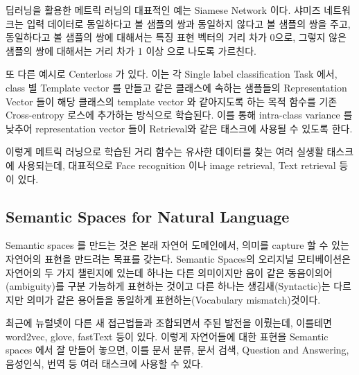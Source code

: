 딥러닝을 활용한 메트릭 러닝의 대표적인 예는 Siamese Network 이다. 샤미즈 네트워크는 입력 데이터로 동일하다고 볼 샘플의 쌍과 동일하지 않다고 볼 샘플의 쌍을 주고, 동일하다고 볼 샘플의 쌍에 대해서는 특징 표현 벡터의 거리 차가 0으로, 그렇지 않은 샘플의 쌍에 대해서는 거리 차가 1 이상 으로 나도록 가르친다. 

또 다른 예시로 Centerloss 가 있다. 이는 각 Single label classification Task 에서, class 별 Template vector 를 만들고 같은 클래스에 속하는 샘플들의 Representation Vector 들이 해당 클래스의 template vector 와 같아지도록 하는 목적 함수를 기존 Cross-entropy 로스에 추가하는 방식으로 학습된다. 이를 통해 intra-class variance 를 낮추어 representation vector 들이 Retrieval와 같은 태스크에 사용될 수 있도록 한다. 

이렇게 메트릭 러닝으로 학습된 거리 함수는 유사한 데이터를 찾는 여러 실생활 태스크에 사용되는데, 대표적으로 Face recognition 이나 image retrieval, Text retrieval 등이 있다. 


\subsection{Semantic Spaces for Natural Language}

Semantic spaces 를 만드는 것은 본래 자연어 도메인에서, 의미를 capture 할 수 있는 자연어의 표현을 만드려는 목표를 갖는다. Semantic Spaces의 오리지널 모티베이션은 자연어의 두 가지 챌린지에 있는데 하나는 다른 의미이지만 음이 같은 동음이의어(ambiguity)를 구분 가능하게 표현하는 것이고 다른 하나는 생김새(Syntactic)는 다르지만 의미가 같은 용어들을 동일하게 표현하는(Vocabulary mismatch)것이다. 

최근에 뉴럴넷이 다른 새 접근법들과 조합되면서 주된 발전을 이뤘는데, 이를테면 word2vec, glove, fastText 등이 있다. 이렇게 자연어들에 대한 표현을 Semantic spaces 에서 잘 만들어 놓으면, 이를 문서 분류, 문서 검색, Question and Answering, 음성인식, 번역 등 여러 태스크에 사용할 수 있다.
